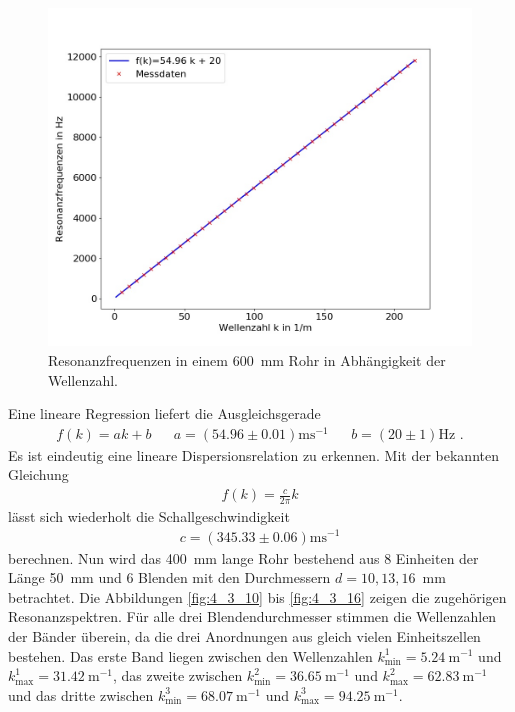 \begin{figure}
\centering
\includegraphics[width=\textwidth]{content/messungen/Chapter4/plot_4_2.jpg}
\caption{Resonanzfrequenzen in einem 600~mm Rohr in Abhängigkeit der Wellenzahl.}
\label{fig:4_2_2}
\end{figure}
Eine lineare Regression liefert die Ausgleichsgerade
\begin{align*}
f(k)=ak+b &&a=(54.96\pm 0.01)\text{ms}^{-1}&&b=(20\pm 1)\text{Hz} \text{ .}
\end{align*}
Es ist eindeutig eine lineare Dispersionsrelation zu erkennen.
Mit der bekannten Gleichung
\begin{align*}
f(k)=\frac{c}{2\pi}k
\end{align*}
lässt sich wiederholt die Schallgeschwindigkeit 
\begin{align*}
c=(345.33\pm0.06)\text{ms}^{-1}
\end{align*}
berechnen.
\FloatBarrier
Nun wird das 400~mm lange Rohr bestehend aus 8 Einheiten der Länge 50~mm und 6 Blenden mit den Durchmessern $d=10,13,16$~mm betrachtet.
Die Abbildungen \ref{fig:4_3_10} bis \ref{fig:4_3_16} zeigen die zugehörigen Resonanzspektren.
Für alle drei Blendendurchmesser stimmen die Wellenzahlen der Bänder überein, da die drei Anordnungen aus gleich vielen Einheitszellen bestehen.
Das erste Band liegen zwischen den Wellenzahlen $k^1_\text{min}=5.24~\text{m}^{-1}$ und $k^1_\text{max}=31.42~\text{m}^{-1}$, das zweite zwischen $k^2_\text{min}=36.65~\text{m}^{-1}$ und $k^2_\text{max}=62.83~\text{m}^{-1}$ und das dritte zwischen $k^3_\text{min}=68.07~\text{m}^{-1}$ und $k^3_\text{max}=94.25~\text{m}^{-1}$.

